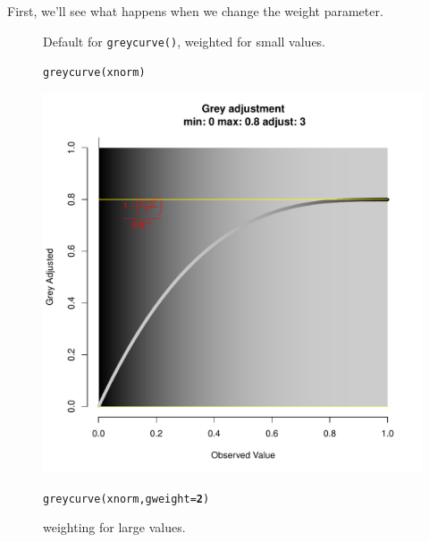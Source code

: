 \documentclass[letterpaper]{article}\usepackage[]{graphicx}\usepackage[]{color}
\makeatletter
\newcommand{\hlnum}[1]{\textcolor[rgb]{0.502,0,0.502}{\textbf{#1}}}%
\newcommand{\hlstd}[1]{\textcolor[rgb]{0,0,0}{#1}}%
\newcommand{\hlkwc}[1]{\textcolor[rgb]{0,0.502,0.753}{#1}}%
\newcommand{\hlkwd}[1]{\textcolor[rgb]{0,0.267,0.4}{#1}}%
\newenvironment{kframe}{%
 \def\at@end@of@kframe{}%
 \ifinner\ifhmode%
  \def\at@end@of@kframe{\end{minipage}}%
  \begin{minipage}{\columnwidth}%
 \fi\fi%
 \def\FrameCommand##1{\hskip\@totalleftmargin \hskip-\fboxsep
 \colorbox{shadecolor}{##1}\hskip-\fboxsep
     \hskip-\linewidth \hskip-\@totalleftmargin \hskip\columnwidth}%
 \MakeFramed {\advance\hsize-\width
   \@totalleftmargin\z@ \linewidth\hsize
   \@setminipage}}%
 {\par\unskip\endMakeFramed%
 \at@end@of@kframe}
\newenvironment{knitrout}{}{} %
\makeatother
\begin{document}
First, we'll see what happens when we change the weight parameter.
\begin{figure}[h!]
\begin{minipage}[b]{0.45\linewidth}
\centering
\caption{\footnotesize Default for \texttt{greycurve()}, weighted for small values.}
\begin{knitrout}\footnotesize
{}\color{fgcolor}\begin{kframe}
\begin{alltt}
\hlkwd{greycurve}\hlstd{(xnorm)}
\end{alltt}
\end{kframe}

{\centering \includegraphics[width=\linewidth]{figure/greycurve_normal} 

}



\end{knitrout}

\end{minipage}
\hspace{0.5cm}
\begin{minipage}[b]{0.45\linewidth}
\centering
\caption{\footnotesize weighting for large values.}
\begin{knitrout}\footnotesize
{}\color{fgcolor}\begin{kframe}
\begin{alltt}
\hlkwd{greycurve}\hlstd{(xnorm,} \hlkwc{gweight} \hlstd{=} \hlnum{2}\hlstd{)}
\end{alltt}
\end{kframe}


\end{knitrout}
\end{minipage}
\end{figure}
\end{document}
